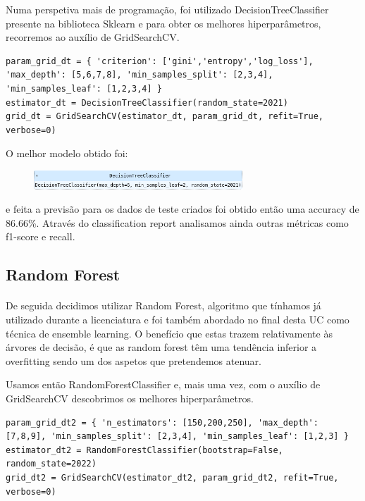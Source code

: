 Numa perspetiva mais de programação, foi utilizado DecisionTreeClassifier presente na biblioteca Sklearn e para obter os melhores hiperparâmetros, recorremos ao auxílio de GridSearchCV.

\begin{verbatim}
param_grid_dt = { 'criterion': ['gini','entropy','log_loss'], 'max_depth': [5,6,7,8], 'min_samples_split': [2,3,4], 'min_samples_leaf': [1,2,3,4] }
estimator_dt = DecisionTreeClassifier(random_state=2021)
grid_dt = GridSearchCV(estimator_dt, param_grid_dt, refit=True, verbose=0)
\end{verbatim}

O melhor modelo obtido foi:
\begin{figure}[H]
    \centering
    \centerline{\includegraphics[width=0.7\textwidth]{Imagens/Competição/dt.png}}
    \label{fig: dt}
\end{figure}

e feita a previsão para os dados de teste criados foi obtido então uma accuracy de 86.66\%. Através do classification report analisamos ainda outras métricas como f1-score e recall.

\subsection{Random Forest}
\paragraph{}
De seguida decidimos utilizar Random Forest, algoritmo que tínhamos já utilizado durante a licenciatura e foi também abordado no final desta UC como técnica de ensemble learning.
O benefício que estas trazem relativamente às árvores de decisão, é que as random forest têm uma tendência inferior a overfitting sendo um dos aspetos que pretendemos atenuar.

Usamos então RandomForestClassifier e, mais uma vez, com o auxílio de GridSearchCV descobrimos os melhores hiperparâmetros.

\begin{verbatim}
param_grid_dt2 = { 'n_estimators': [150,200,250], 'max_depth': [7,8,9], 'min_samples_split': [2,3,4], 'min_samples_leaf': [1,2,3] }
estimator_dt2 = RandomForestClassifier(bootstrap=False, random_state=2022)
grid_dt2 = GridSearchCV(estimator_dt2, param_grid_dt2, refit=True, verbose=0)
\end{verbatim}

